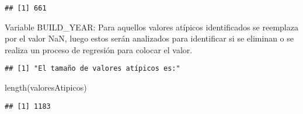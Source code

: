\documentclass[
]{article}
\newenvironment{Shaded}{\begin{snugshade}}{\end{snugshade}}
\newcommand{\ConstantTok}[1]{\textcolor[rgb]{0.00,0.00,0.00}{#1}}
\newcommand{\FunctionTok}[1]{\textcolor[rgb]{0.00,0.00,0.00}{#1}}
\newcommand{\NormalTok}[1]{#1}
\newcommand{\OtherTok}[1]{\textcolor[rgb]{0.56,0.35,0.01}{#1}}
\newcommand{\SpecialCharTok}[1]{\textcolor[rgb]{0.00,0.00,0.00}{#1}}
\newcommand{\StringTok}[1]{\textcolor[rgb]{0.31,0.60,0.02}{#1}}
\begin{document}
\begin{verbatim}
## [1] 661
\end{verbatim}

\begin{Shaded}
\end{Shaded}

Variable BUILD\_YEAR: Para aquellos valores atípicos identificados se
reemplaza por el valor NaN, luego estos serán analizados para
identificar si se eliminan o se realiza un proceso de regresión para
colocar el valor.

\begin{Shaded}
\end{Shaded}

\begin{verbatim}
## [1] "El tamaño de valores atípicos es:"
\end{verbatim}

\begin{Shaded}
\begin{Highlighting}[]
\FunctionTok{length}\NormalTok{(valoresAtipicos)}
\end{Highlighting}
\end{Shaded}

\begin{verbatim}
## [1] 1183
\end{verbatim}

\begin{Shaded}
\end{Shaded}
\end{document}
